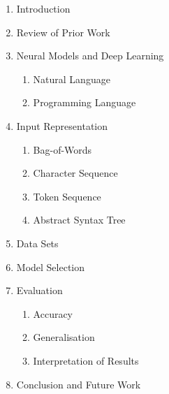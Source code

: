 \documentclass[twoside,a4paper]{scrartcl}
\begin{document}
\begin{enumerate}
\item Introduction
\item Review of Prior Work
\item Neural Models and Deep Learning
    \begin{enumerate}
    \item Natural Language
    \item Programming Language
    \end{enumerate}
\item Input Representation
    \begin{enumerate}
    \item Bag-of-Words
    \item Character Sequence
    \item Token Sequence
    \item Abstract Syntax Tree
    \end{enumerate}
\item Data Sets
\item Model Selection
\item Evaluation
    \begin{enumerate}
    \item Accuracy
    \item Generalisation
    \item Interpretation of Results
    \end{enumerate}
\item Conclusion and Future Work
\end{enumerate}



\end{document}
